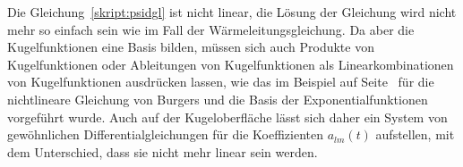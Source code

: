 Die Gleichung~\eqref{skript:psidgl} ist nicht linear, die Lösung
der Gleichung wird nicht mehr so einfach sein wie im Fall der
Wärmeleitungsgleichung.
Da aber die Kugelfunktionen eine Basis bilden, müssen sich auch
Produkte von Kugelfunktionen oder Ableitungen von Kugelfunktionen
als Linearkombinationen von Kugelfunktionen ausdrücken lassen,
wie das im Beispiel auf Seite~\pageref{subsubsection:komplexeres}
für die nichtlineare Gleichung von Burgers und die Basis der
Exponentialfunktionen vorgeführt wurde.
Auch auf der Kugeloberfläche lässt sich daher ein System von gewöhnlichen
Differentialgleichungen für die Koeffizienten $a_{lm}(t)$ aufstellen,
mit dem Unterschied, dass sie nicht mehr linear sein werden.







